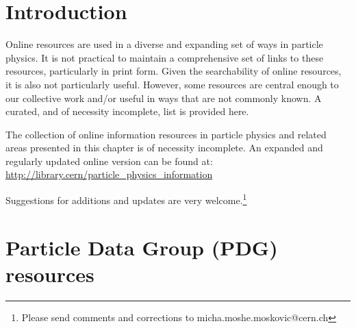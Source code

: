 \section{Introduction}\label{databases:sec:introduction}
Online resources are used in a diverse and expanding set of ways in particle physics. 
It is not practical to maintain a comprehensive set of links to these resources, 
particularly in print form. Given the searchability of online resources, it is also 
not particularly useful. However, some resources are central enough to our collective 
work and/or useful in ways that are not commonly known.  A curated, and of necessity 
incomplete, list is provided here. 


The collection of online information resources in particle physics and
related areas presented in this chapter is of necessity incomplete. An
expanded and regularly updated online version can be found at:
\url{http://library.cern/particle_physics_information}

Suggestions for additions and updates are very welcome.\footnote{Please
  send comments and corrections to micha.moshe.moskovic@cern.ch}

\section{Particle Data Group (PDG)
resources}\label{databases:sec:resources}

